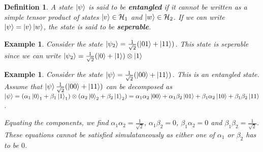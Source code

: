 \documentclass[12pt,twoside]{report}
\theoremstyle{thmstyle}
\newtheorem{defn}[subsection]{Definition}
\newtheorem{eg}[subsection]{Example}
\begin{document}
\begin{defn}
A state $\ket{\psi}$ is said to be \textbf{entangled} if it cannot be written as a simple tensor product of states $\ket{v} \in \mathcal{H}_1$ and $\ket{w} \in \mathcal{H}_2$. If we can write $\ket{\psi} = \ket{v}\ket{w}$, the state is said to be \textbf{seperable}.
\end{defn}

\begin{eg}
Consider the state $\ket{\psi_2} = \frac{1}{\sqrt{2}} (\ket{01} + \ket{11})$. This state is seperable since we can write $\ket{\psi_2} = \frac{1}{\sqrt{2}} (\ket{0} + \ket{1}) \otimes \ket{1}$
\end{eg}


\begin{eg}
Consider the state $\ket{\psi} = \frac{1}{\sqrt{2}} (\ket{00} + \ket{11})$. This is an entangled state.
    \vspace{0.5cm}
    Assume that  $\ket{\psi} \frac{1}{\sqrt{2}} (\ket{00} + \ket{11}) $ can be decomposed as $\ket{\psi} = (\alpha_1 \ket{0}_1 + \beta_1 \ket{1}_1) \otimes (\alpha_2 \ket{0}_2 + \beta_2 \ket{1}_2) = \alpha_1 \alpha_2 \ket{00} + \alpha_1 \beta_2 \ket{01} + \beta_1 \alpha_2 \ket{10} + \beta_1 \beta_2 \ket{11}$.

    \vspace{0.5cm}

    Equating the components, we find $\alpha_1 \alpha_2 = \frac{1}{\sqrt{2}}$, $\alpha_1 \beta_2 = 0$, $\beta_1 \alpha_2 = 0$ and $\beta_1 \beta_2 = \frac{1}{\sqrt{2}}$. These equations cannot be satisfied simulataneously as either one of $\alpha_1$ or $\beta_2$ has to be $0$.
\end{eg}
\end{document}
